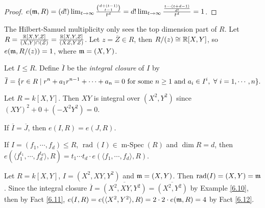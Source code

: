 \begin{proof}
    $e(\mathfrak{m},R) = (d!) \lim_{t \to \infty} \frac{\binom{d+(t-1)}{t-1}}{t^{d}} = d! \lim_{t \to \infty} \frac{\frac{t \cdots (t+d-1)}{d!}}{t^{d}} = 1$.
\end{proof}

\begin{fact}\label{6.8}
    The Hilbert-Samuel multiplicity only sees the top dimension part of $R$. Let $R = \frac{\mathbb{R}[X,Y,Z]}{(X,Y) \cap (Z)} = \frac{\mathbb{R}[X,Y,Z]}{(XZ,YZ)}$. Let $z = \overbar{Z} \in R$, then $R/(z) \cong \mathbb{R}[X,Y]$, so $e(\mathfrak{m},R/(z)) = 1$, where $\mathfrak{m} = (X,Y)$.
\end{fact}

\begin{definition}\label{6.9}
    Let $I \leq R$. Define $\overbar{I}$ be the \emph{integral closure} of $I$ by 
    \[\overbar{I} = \{r \in R \mid r^{n} + a_1r^{n-1} + \cdots + a_n = 0 \text{ for some $n \geq 1$ and $a_i \in I^{i}$}, \fa i = 1,\cdots,n\}.\]
\end{definition}

\begin{example}\label{6.10}
    Let $R = k[X,Y]$. Then $XY$ is integral over $(X^{2},Y^{2})$ since $(XY)^{2} + 0 + (-X^{2}Y^{2}) = 0$.
\end{example}

\begin{fact}\label{6.11}
    If $\overbar{I} = \overbar{J}$, then $e(I,R) = e(J,R)$.
\end{fact}

\begin{fact}\label{6.12}
    If $I = (f_1,\cdots,f_d) \leq R$, $\operatorname{rad}(I) \in \operatorname{m-Spec}(R)$ and $\dim R = d$, then $e(\langle f_1^{t_1},\cdots,f_d^{t_d} \rangle,R) = t_1 \cdots t_d \cdot e(\langle f_1,\cdots,f_d \rangle,R)$.
\end{fact}

\begin{example}\label{6.13}
    Let $R = k[X,Y]$, $I = (X^{2},XY,Y^{2})$ and $\mathfrak{m} = (X,Y)$. Then $\operatorname{rad}(I) = (X,Y) = \mathfrak{m}$. Since the integral closure $\overbar{I} = \overbar{(X^{2},XY,Y^{2})} = \overbar{(X^{2},Y^{2})}$ by Example \ref{6.10}, then by Fact \ref{6.11}, $e(I,R) = e(\langle X^{2},Y^{2} \rangle, R) = 2 \cdot 2 \cdot e(\mathfrak{m},R) = 4$ by Fact \ref{6.12}.
\end{example}


